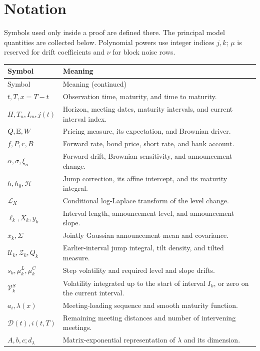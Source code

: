 \clearpage
\section{Notation}
Symbols used only inside a proof are defined there. The principal model quantities are collected below. Polynomial powers use integer indices $j,k$; $\mu$ is reserved for drift coefficients and $\nu$ for block noise rows.

{\small
\begin{longtable}{p{.31\linewidth}p{.60\linewidth}}
\toprule
Symbol & Meaning\\
\midrule
\endfirsthead
\toprule
Symbol & Meaning (continued)\\
\midrule
\endhead
\bottomrule
\endfoot
$t,T,x=T-t$ & Observation time, maturity, and time to maturity.\\
$H,T_n,I_m,j(t)$ & Horizon, meeting dates, maturity intervals, and current interval index.\\
$Q,\mathbb E,W$ & Pricing measure, its expectation, and Brownian driver.\\
$f,P,r,B$ & Forward rate, bond price, short rate, and bank account.\\
$\alpha,\sigma,\xi_n$ & Forward drift, Brownian sensitivity, and announcement change.\\
$h,h_0,\mathcal H$ & Jump correction, its affine intercept, and its maturity integral.\\
$\mathcal L_X$ & Conditional log-Laplace transform of the level change.\\
$\ell_k,X_k,y_k$ & Interval length, announcement level, and announcement slope.\\
$\bar x_k,\Sigma$ & Jointly Gaussian announcement mean and covariance.\\
$\mathcal U_k,\mathcal Z_k,Q_k$ & Earlier-interval jump integral, tilt density, and tilted measure.\\
$s_k,\mu_k^L,\mu_k^C$ & Step volatility and required level and slope drifts.\\
$\mathcal V_k^S$ & Volatility integrated up to the start of interval $I_k$, or zero on the current interval.\\
$a_i,\lambda(x)$ & Meeting-loading sequence and smooth maturity function.\\
$\mathcal D(t),i(t,T)$ & Remaining meeting distances and number of intervening meetings.\\
$A,b,c;d_\lambda$ & Matrix-exponential representation of $\lambda$ and its dimension.\\

\end{longtable}}
